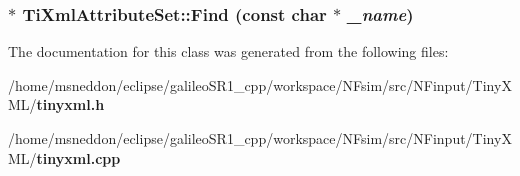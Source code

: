 \subsubsection{$\ast$ TiXmlAttributeSet::Find (const char $\ast$ {\em \_\-name})\hspace{0.3cm}{\tt  [inline]}}\label{classTiXmlAttributeSet_2f210bed54c832adf1683c44c35727b9}




The documentation for this class was generated from the following files:\begin{CompactItemize}
\item 
/home/msneddon/eclipse/galileoSR1\_\-cpp/workspace/NFsim/src/NFinput/TinyXML/{\bf tinyxml.h}\item 
/home/msneddon/eclipse/galileoSR1\_\-cpp/workspace/NFsim/src/NFinput/TinyXML/{\bf tinyxml.cpp}\end{CompactItemize}
